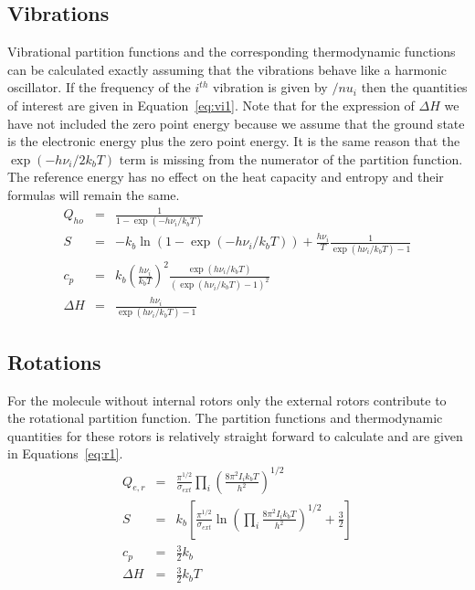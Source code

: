 \documentclass[a4paper,12pt]{article}
\begin{document}
\subsection{Vibrations}
Vibrational partition functions and the corresponding thermodynamic functions can be calculated exactly assuming that the vibrations behave like a harmonic oscillator. If the frequency of the $i^{th}$ vibration is given by $/nu_i$ then the quantities of interest are given in Equation~\ref{eq:vi1}. Note that for the expression of $\Delta H$ we have not included the zero point energy because we assume that the ground state is the electronic energy plus the zero point energy. It is the same reason that the $\exp{(-h\nu_i/2k_bT)}$ term is missing from the numerator of the partition function. The reference energy has no effect on the heat capacity and entropy and their formulas will remain the same.
\begin{eqnarray}
Q_{ho} &=& \frac{1}{1-\exp{(-h\nu_i/k_bT)}} \nonumber \\
S &=& -k_b \ln\left(1-\exp{(-h\nu_i/k_bT)}\right)+\frac{h\nu_i}{T}\frac{1}{\exp{(h\nu_i/k_bT)}-1}\nonumber \\
c_p &=& k_b\left(\frac{h\nu_i}{k_bT}\right)^2 \frac{\exp{(h\nu_i/k_bT)}}{\left(\exp{(h\nu_i/k_bT)}-1\right)^2}\nonumber \\
\Delta H &=& \frac{h\nu_i}{\exp{(h\nu_i/k_bT)}-1}
\label{eq:vi1}
\end{eqnarray}

\subsection{Rotations}
For the molecule without internal rotors only the external rotors contribute to the rotational partition function. The partition functions and thermodynamic quantities for these rotors is relatively straight forward to calculate and are given in Equations~\ref{eq:r1}.
\begin{eqnarray}
 Q_{e,r}&=&\frac{\pi^{1/2}}{\sigma_{ext}}\prod_i \left(\frac{8\pi^2I_ik_bT}{ h^2}\right)^{1/2} \nonumber \\
S&=& k_b \left[\frac{\pi^{1/2}}{\sigma_{ext}} \ln \left(\prod_i \frac{8\pi^2I_ik_bT}{h^2}\right)^{1/2} +\frac{3}{2}\right] \nonumber \\
c_p&=& \frac{3}{2}k_b\nonumber \\
\Delta H &=& \frac{3}{2}k_bT
\label{eq:r1}
\end{eqnarray}
\end{document}
